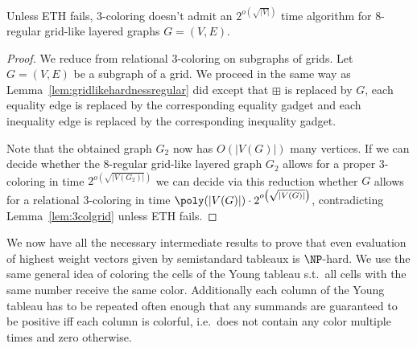 \begin{lemma}
    \label{lem:gridlikeethhardness}
    Unless ETH fails, $3$-coloring doesn't admit an $2^{o\left(\sqrt{|V|}\right)}$ time algorithm for $8$-regular grid-like layered graphs $G = (V, E)$.
\end{lemma}
\begin{proof}
    We reduce from relational $3$-coloring on subgraphs of grids.
    Let $G = (V, E)$ be a subgraph of a grid.
    We proceed in the same way as Lemma~\ref{lem:gridlikehardnessregular} did except that $\boxplus$ is replaced by $G$, each equality edge is replaced by the corresponding equality gadget and each inequality edge is replaced by the corresponding inequality gadget.
    
    Note that the obtained graph $G_2$ now has $O(|V(G)|)$ many vertices.
    If we can decide whether the $8$-regular grid-like layered graph $G_2$ allows for a proper $3$-coloring in time $2^{o\left(\sqrt{|V(G_2)|}\right)}$ we can decide via this reduction whether $G$ allows for a relational $3$-coloring in time $\poly(|V(G)|) \cdot 2^{o\left(\sqrt{|V(G)|}\right)}$, contradicting Lemma~\ref{lem:3colgrid} unless ETH fails.
\end{proof}

We now have all the necessary intermediate results to prove that even evaluation of highest weight vectors given by semistandard tableaux is $\NP$-hard.
We use the same general idea of coloring the cells of the Young tableau s.t.\ all cells with the same number receive the same color.
Additionally each column of the Young tableau has to be repeated often enough that any summands are guaranteed to be positive iff each column is colorful, i.e.\ does not contain any color multiple times and zero otherwise.

